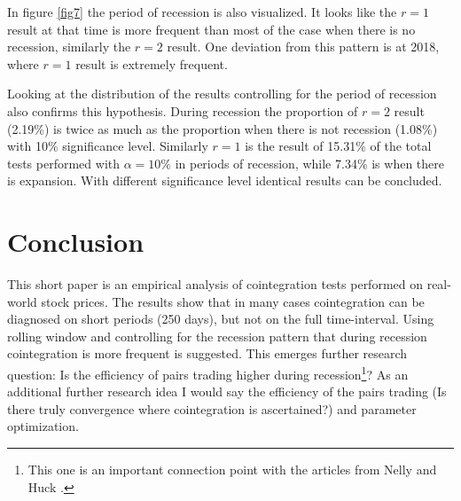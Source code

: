 \documentclass[12pt, a4paper, twoside, titlepage]{article}
\begin{document}
In figure \ref{fig7} the period of recession is also visualized. It looks like the $r = 1$ result at that time is more frequent than most of the case when there is no recession, similarly the $r = 2$ result. One deviation from this pattern is at 2018, where $r = 1$ result is extremely frequent.

Looking at the distribution of the results controlling for the period of recession also confirms this hypothesis. During recession the proportion of $r = 2$ result (2.19\%) is twice as much as the proportion when there is not recession (1.08\%) with 10\% significance level. Similarly $r = 1$ is the result of 15.31\% of the total tests performed with $\alpha = 10\%$ in periods of recession, while 7.34\% is when there is expansion. With different significance level identical results can be concluded.

\section{Conclusion}

This short paper is an empirical analysis of cointegration tests performed on real-world stock prices. The results show that in many cases cointegration can be diagnosed on short periods (250 days), but not on the full time-interval. Using rolling window and controlling for the recession pattern that during recession cointegration is more frequent is suggested. This emerges further research question: Is the efficiency of pairs trading higher during recession\footnote{This one is an important connection point with the articles from Nelly 
\cite{Neely.2014} and Huck \cite{Huck.2014}.}? As an additional further research idea I would say the efficiency of the pairs trading (Is there truly convergence where cointegration is ascertained?) and parameter optimization.


\begin{appendix}
  \listoffigures
\end{appendix}



\end{document}
